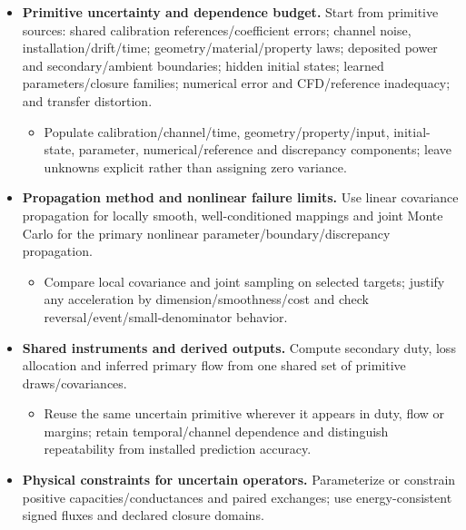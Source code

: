 \begin{itemize}[leftmargin=*]
\item {}\textbf{Primitive uncertainty and dependence budget.} Start from primitive sources: shared calibration references/\allowbreak{}coefficient errors; channel noise, installation/\allowbreak{}drift/\allowbreak{}time; geometry/\allowbreak{}material/\allowbreak{}property laws; deposited power and secondary/\allowbreak{}ambient boundaries; hidden initial states; learned parameters/\allowbreak{}closure families; numerical error and CFD/\allowbreak{}reference inadequacy; and transfer distortion.\cite{jcgm2020measurementmodels}
\begin{itemize}
\item Populate calibration/\allowbreak{}channel/\allowbreak{}time, geometry/\allowbreak{}property/\allowbreak{}input, initial-state, parameter, numerical/\allowbreak{}reference and discrepancy components; leave unknowns explicit rather than assigning zero variance.
\end{itemize}
\item {}\textbf{Propagation method and nonlinear failure limits.} Use linear covariance propagation for locally smooth, well-conditioned mappings and joint Monte Carlo for the primary nonlinear parameter/\allowbreak{}boundary/\allowbreak{}discrepancy propagation.\cite{jcgm2011vectorcovariance}
\begin{itemize}
\item Compare local covariance and joint sampling on selected targets; justify any acceleration by dimension/\allowbreak{}smoothness/\allowbreak{}cost and check reversal/\allowbreak{}event/\allowbreak{}small-denominator behavior.
\end{itemize}
\item {}\textbf{Shared instruments and derived outputs.} Compute secondary duty, loss allocation and inferred primary flow from one shared set of primitive draws/\allowbreak{}covariances.\cite{jcgm2011vectorcovariance,jcgm2020measurementmodels}
\begin{itemize}
\item Reuse the same uncertain primitive wherever it appears in duty, flow or margins; retain temporal/\allowbreak{}channel dependence and distinguish repeatability from installed prediction accuracy.
\end{itemize}
\item {}\textbf{Physical constraints for uncertain operators.} Parameterize or constrain positive capacities/\allowbreak{}conductances and paired exchanges; use energy-consistent signed fluxes and declared closure domains.

\end{itemize}
